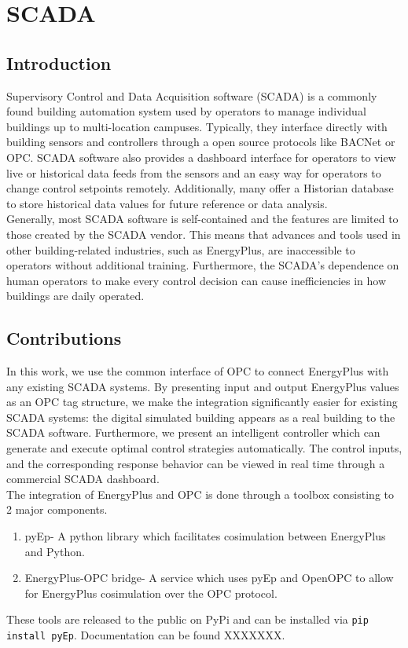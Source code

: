 \section{SCADA}

\subsection{Introduction}

Supervisory Control and Data Acquisition software (SCADA) is a commonly found building automation system used by operators to manage individual buildings up to multi-location campuses. Typically, they interface directly with building sensors and controllers through a open source protocols like BACNet or OPC. SCADA software also provides a dashboard interface for operators to view live or historical data feeds from the sensors and an easy way for operators to change control setpoints remotely. Additionally, many offer a Historian database to store historical data values for future reference or data analysis.\\
Generally, most SCADA software is self-contained and the features are limited to those created by the SCADA vendor. This means that advances and tools used in other building-related industries, such as EnergyPlus, are inaccessible to operators without additional training. Furthermore, the SCADA's dependence on human operators to make every control decision can cause inefficiencies in how buildings are daily operated.\\
\subsection{Contributions}
In this work, we use the common interface of OPC to connect EnergyPlus with any existing SCADA systems. By presenting input and output EnergyPlus values as an OPC tag structure, we make the integration significantly easier for existing SCADA systems: the digital simulated building appears as a real building to the SCADA software. Furthermore, we present an intelligent controller which can generate and execute optimal control strategies automatically. The control inputs, and the corresponding response behavior can be viewed in real time through a commercial SCADA dashboard.\\
The integration of EnergyPlus and OPC is done through a toolbox consisting to 2 major components.
\begin{enumerate}
	\item pyEp- A python library which facilitates cosimulation between EnergyPlus and Python. 
	\item EnergyPlus-OPC bridge- A service which uses pyEp and OpenOPC to allow for EnergyPlus cosimulation over the OPC protocol.
\end{enumerate}
These tools are released to the public on PyPi and can be installed via 
\lstinline[language=bash]{pip install pyEp}. Documentation can be found XXXXXXX.

